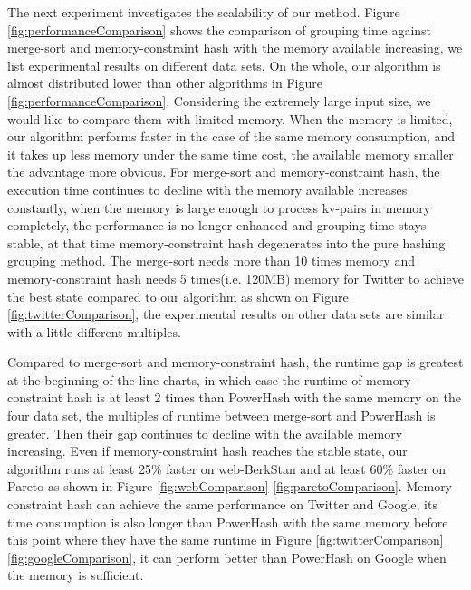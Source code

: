The next experiment investigates the scalability of our method. Figure \ref{fig:performanceComparison} shows the comparison of grouping time against merge-sort and memory-constraint hash with the memory available increasing, we list experimental results on different data sets. 
On the whole, our algorithm is almost distributed lower than other algorithms in Figure \ref{fig:performanceComparison}. Considering the extremely large input size, we would like to compare them with limited memory. When the memory is limited, our algorithm performs faster in the case of the same memory consumption, and it takes up less memory under the same time cost, the available memory smaller the advantage more obvious. For merge-sort and memory-constraint hash, the execution time continues to decline with the memory available increases constantly, when the memory is large enough to process kv-pairs in memory completely, the performance is no longer enhanced and grouping time stays stable, at that time memory-constraint hash degenerates into the pure hashing grouping method. The merge-sort needs more than 10 times memory and memory-constraint hash needs 5 times(i.e. 120MB) memory for Twitter to achieve the best state compared to our algorithm as shown on Figure \ref{fig:twitterComparison}, the experimental results on other data sets are similar with a little different multiples.

Compared to merge-sort and memory-constraint hash, the runtime gap is greatest at the beginning of the line charts, in which case the runtime of memory-constraint hash is at least 2 times than PowerHash with the same memory on the four data set, the multiples of runtime between merge-sort and PowerHash is greater. Then their gap continues to decline with the available memory increasing. Even if memory-constraint hash reaches the stable state, our algorithm runs at least 25\% faster on web-BerkStan and at least 60\% faster on Pareto as shown in Figure \ref{fig:webComparison} \ref{fig:paretoComparison}. Memory-constraint hash can achieve the same performance on Twitter and Google, its time consumption is also longer than PowerHash with the same memory before this point where they have the same runtime in Figure \ref{fig:twitterComparison} \ref{fig:googleComparison}, it can perform better than PowerHash on Google when the memory is sufficient. 
   
